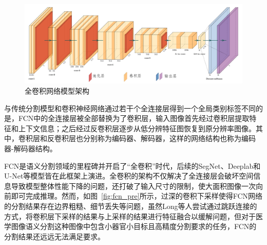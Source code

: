 \begin{figure}[!htbp]
    \centering
    \includegraphics[width=\textwidth]{fig/fcn_frame.png}
    \caption{全卷积网络模型架构}
    \label{fig:fcn_frame}
\end{figure}

与传统分割模型和卷积神经网络通过若干个全连接层得到一个全局类别标签不同的是，FCN中的全连接层被全部替换为了卷积层，输入图像首先经过卷积层提取特征和上下文信息；之后经过反卷积层逐步从低分辨特征图恢复到原分辨率图像。其中，卷积层和反卷积层也分别称为编码器、解码器，这样的网络结构也称为编码器-解码器结构。

FCN是语义分割领域的里程碑并开启了“全卷积”时代，后续的SegNet、Deeplab和U-Net等模型皆在此框架上演进。全卷积的架构不仅解决了全连接层会破坏空间信息导致模型整体性能下降的问题，还打破了输入尺寸的限制，使大面积图像一次向前即可完成推理。然而，如图~\ref{fig:fcn_pre}所示，过深的卷积下采样使得FCN网络的分割结果存在边界粗糙、细节丢失等问题，虽然Long等人\cite{shelhamer2016}尝试通过跳跃连接的方式，将卷积层下采样的结果与上采样的结果进行特征融合以缓解问题，但对于医学图像语义分割这种图像中包含小器官小目标且高精度分割要求的任务，FCN的分割结果还远远无法满足要求。

